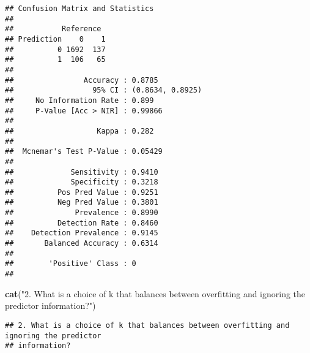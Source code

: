 \documentclass[
]{article}
\newenvironment{Shaded}{\begin{snugshade}}{\end{snugshade}}
\newcommand{\FunctionTok}[1]{\textcolor[rgb]{0.13,0.29,0.53}{\textbf{#1}}}
\newcommand{\NormalTok}[1]{#1}
\newcommand{\StringTok}[1]{\textcolor[rgb]{0.31,0.60,0.02}{#1}}
\begin{document}
\begin{verbatim}
## Confusion Matrix and Statistics
## 
##           Reference
## Prediction    0    1
##          0 1692  137
##          1  106   65
##                                           
##                Accuracy : 0.8785          
##                  95% CI : (0.8634, 0.8925)
##     No Information Rate : 0.899           
##     P-Value [Acc > NIR] : 0.99866         
##                                           
##                   Kappa : 0.282           
##                                           
##  Mcnemar's Test P-Value : 0.05429         
##                                           
##             Sensitivity : 0.9410          
##             Specificity : 0.3218          
##          Pos Pred Value : 0.9251          
##          Neg Pred Value : 0.3801          
##              Prevalence : 0.8990          
##          Detection Rate : 0.8460          
##    Detection Prevalence : 0.9145          
##       Balanced Accuracy : 0.6314          
##                                           
##        'Positive' Class : 0               
## 
\end{verbatim}

\begin{Shaded}
\begin{Highlighting}[]
\FunctionTok{cat}\NormalTok{(}\StringTok{"2. What is a choice of k that balances between overfitting and ignoring the predictor}
\StringTok{information?"}\NormalTok{)}
\end{Highlighting}
\end{Shaded}

\begin{verbatim}
## 2. What is a choice of k that balances between overfitting and ignoring the predictor
## information?
\end{verbatim}
\end{document}

